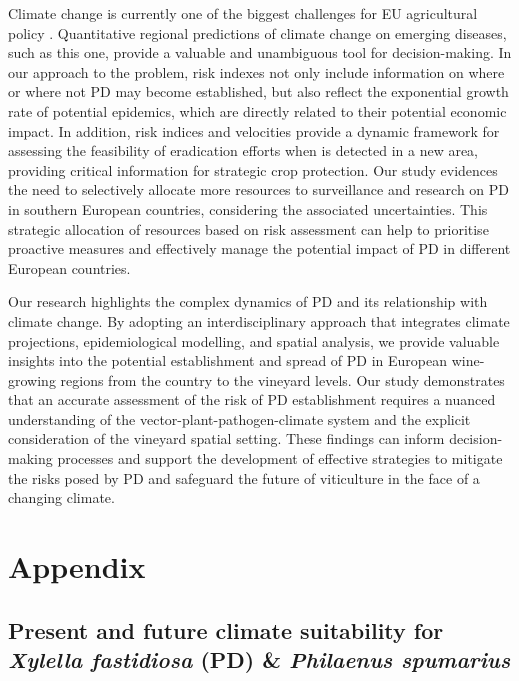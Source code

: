 Climate change is currently one of the biggest challenges for EU
agricultural policy \cite{fellmann2018major}. Quantitative regional predictions
of climate change on emerging diseases, such as this one, provide a valuable
and unambiguous tool for decision-making. In our approach to the problem, risk
indexes not only include information on where or where not PD may become
established, but also reflect the exponential growth rate of potential
epidemics, which are directly related to their potential economic impact. In
addition, risk indices and velocities provide a dynamic framework for assessing
the feasibility of eradication efforts when \xf{} is detected in a new area,
providing critical information for strategic crop protection. Our study
evidences the need to selectively allocate more resources to surveillance and
research on PD in southern European countries, considering the associated
uncertainties. This strategic allocation of resources based on risk assessment
can help to prioritise proactive measures and effectively manage the potential
impact of PD in different European countries.

Our research highlights the complex dynamics of PD and its relationship
with climate change. By adopting an interdisciplinary approach that integrates
climate projections, epidemiological modelling, and spatial analysis, we
provide valuable insights into the potential establishment and spread of PD in
European wine-growing regions from the country to the vineyard levels. Our
study demonstrates that an accurate assessment of the risk of PD establishment
requires a nuanced understanding of the vector-plant-pathogen-climate system
and the explicit consideration of the vineyard spatial setting. These findings
can inform decision-making processes and support the development of effective
strategies to mitigate the risks posed by PD and safeguard the future of
viticulture in the face of a changing climate.

\section{Appendix}

\subsection{Present and future climate suitability for \textit{Xylella
        fastidiosa} (PD) \& \textit{Philaenus spumarius}}

